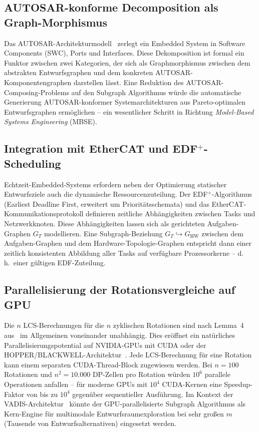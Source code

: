 ﻿\documentclass[a4paper,12pt]{article}
\theoremstyle{definition}
\begin{document}
\subsection{AUTOSAR-konforme Decomposition als Graph-Morphismus}

Das AUTOSAR-Architekturmodell~\cite{autosar2021} zerlegt ein Embedded System
in Software Components (SWC), Ports und Interfaces.
Diese Dekomposition ist formal ein Funktor zwischen zwei Kategorien, der sich
als Graphmorphismus zwischen dem abstrakten Entwurfsgraphen und dem konkreten
AUTOSAR-Komponentengraphen darstellen l\"{a}sst.
Eine Reduktion des AUTOSAR-Composing-Problems auf den Subgraph Algorithmus
w\"{u}rde die automatische Generierung AUTOSAR-konformer Systemarchitekturen aus
Pareto-optimalen Entwurfsgraphen erm\"{o}glichen -- ein wesentlicher Schritt in
Richtung \emph{Model-Based Systems Engineering} (MBSE).

\subsection{Integration mit EtherCAT und EDF$^+$-Scheduling}

Echtzeit-Embedded-Systems erfordern neben der Optimierung statischer
Entwurfsziele auch die dynamische Ressourcenzuteilung.
Der EDF$^+$-Algorithmus~\cite{epp2026edf} (Earliest Deadline First,
erweitert um Priorit\"{a}tsschemata) und das EtherCAT-Kommunikationsprotokoll
definieren zeitliche Abh\"{a}ngigkeiten zwischen Tasks und Netzwerkknoten.
Diese Abh\"{a}ngigkeiten lassen sich als gerichteten Aufgaben-Graphen $G_T$
modellieren. Eine Subgraph-Beziehung $G_T \hookrightarrow G_\mathrm{HW}$
zwischen dem Aufgaben-Graphen und dem Hardware-Topologie-Graphen entspricht
dann einer zeitlich konsistenten Abbildung aller Tasks auf verf\"{u}gbare
Prozessorkerne -- d.\,h.\ einer g\"{u}ltigen EDF-Zuteilung.

\subsection{Parallelisierung der Rotationsvergleiche auf GPU}

Die $n$ LCS-Berechnungen f\"{u}r die $n$ zyklischen Rotationen sind nach
Lemma~4 aus~\cite{epp2026subgraph} im Allgemeinen voneinander unabh\"{a}ngig.
Dies er\"{o}ffnet ein nat\"{u}rliches Parallelisierungspotential auf NVIDIA-GPUs
mit CUDA oder der HOPPER/BLACKWELL-Architektur~\cite{nvidia2023hopper}.
Jede LCS-Berechnung f\"{u}r eine Rotation kann einem separaten CUDA-Thread-Block
zugewiesen werden. Bei $n = 100$ Rotationen und $n^2 = 10.000$
DP-Zellen pro Rotation w\"{u}rden $10^6$ parallele Operationen anfallen --
f\"{u}r moderne GPUs mit $10^4$ CUDA-Kernen eine Speedup-Faktor von bis zu $10^4$
gegen\"{u}ber sequentieller Ausf\"{u}hrung.
Im Kontext der VADIS-Architektur~\cite{epp2026vadis} k\"{o}nnte der
GPU-parallelisierte Subgraph Algorithmus als Kern-Engine f\"{u}r
multimodale Entwurfsraumexploration bei sehr gro{\ss}en $m$
(Tausende von Entwurfsalternativen) eingesetzt werden.
\end{document}
